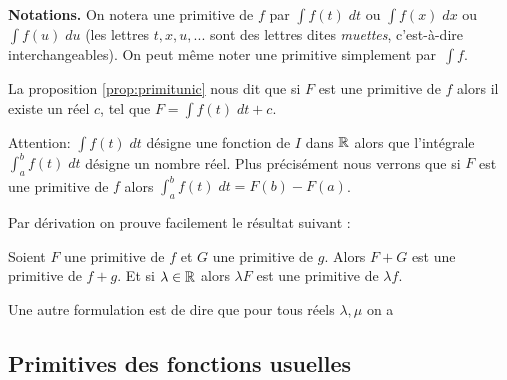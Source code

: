 \documentclass[class=report,crop=false]{standalone}
\begin{document}
\textbf{Notations.}
On notera une primitive de $f$ par
$\int f(t) \; dt$  ou $\int f(x) \; dx$ ou $\int f(u) \; du$
(les lettres $t, x, u, ...$ sont  des  lettres dites \emph{muettes},
c'est-à-dire interchangeables).
On peut même noter une primitive simplement par~$\int f$.

La proposition \ref{prop:primitunic}
nous dit que si $F$ est une primitive de $f$
alors il existe un réel $c$, tel que $F=\int f(t) \; dt + c$.

Attention: $\int f(t)\;dt$ désigne une fonction de $I$ dans $\mathbb{R}$
alors que l'intégrale $\int_a^b f(t) \; dt$ désigne un nombre réel.
Plus précisément nous verrons que si $F$ est une primitive de $f$ alors
$\int_a^b f(t) \; dt = F(b)-F(a)$.

\medskip

Par dérivation on prouve facilement le résultat suivant :
\begin{proposition}
Soient $F$ une primitive de $f$ et $G$ une primitive de $g$. Alors $F+G$ est une
primitive de $f+g$.
Et si $\lambda \in \mathbb{R}$ alors $\lambda F$ est une primitive de $\lambda f$.
\end{proposition}

Une autre formulation est de dire que pour tous réels $\lambda,\mu$ on a


\subsection{Primitives des fonctions usuelles}
\end{document}
